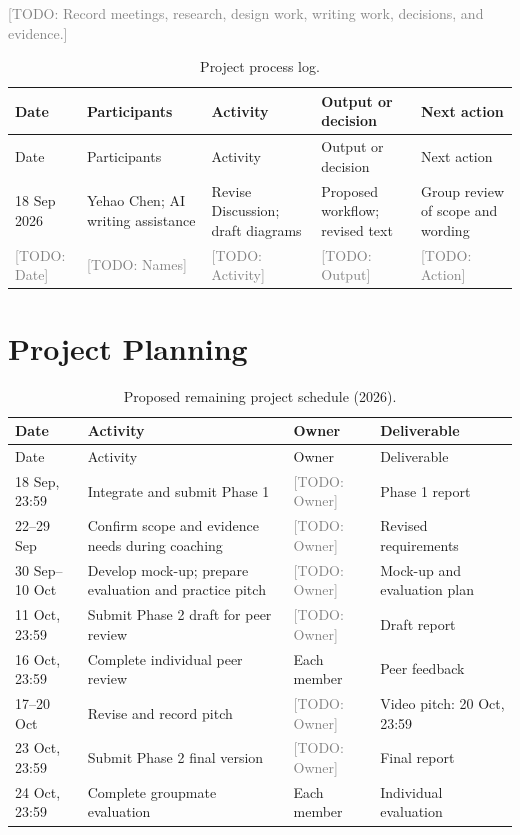 \documentclass[11pt,a4paper]{article}
\newcommand{\placeholder}[1]{\textcolor{gray}{[TODO: #1]}}
\begin{document}
\placeholder{Record meetings, research, design work, writing work, decisions, and evidence.}

\begin{longtable}{@{}p{}p{}p{}p{}p{}@{}}
\caption{Project process log.}\\
\toprule
Date & Participants & Activity & Output or decision & Next action \\
\midrule
\endfirsthead
\toprule
Date & Participants & Activity & Output or decision & Next action \\
\midrule
\endhead
18 Sep 2026 & Yehao Chen; AI writing assistance & Revise Discussion; draft diagrams & Proposed workflow; revised text & Group review of scope and wording \\
\placeholder{Date} & \placeholder{Names} & \placeholder{Activity} & \placeholder{Output} & \placeholder{Action} \\
\bottomrule
\end{longtable}

\clearpage
\section{Project Planning}

\begin{longtable}{@{}p{}p{}p{}p{}@{}}
\caption{Proposed remaining project schedule (2026).}\\
\toprule
Date & Activity & Owner & Deliverable \\
\midrule
\endfirsthead
\toprule
Date & Activity & Owner & Deliverable \\
\midrule
\endhead
18 Sep, 23:59 & Integrate and submit Phase 1 & \placeholder{Owner} & Phase 1 report \\
22--29 Sep & Confirm scope and evidence needs during coaching & \placeholder{Owner} & Revised requirements \\
30 Sep--10 Oct & Develop mock-up; prepare evaluation and practice pitch & \placeholder{Owner} & Mock-up and evaluation plan \\
11 Oct, 23:59 & Submit Phase 2 draft for peer review & \placeholder{Owner} & Draft report \\
16 Oct, 23:59 & Complete individual peer review & Each member & Peer feedback \\
17--20 Oct & Revise and record pitch & \placeholder{Owner} & Video pitch: 20 Oct, 23:59 \\
23 Oct, 23:59 & Submit Phase 2 final version & \placeholder{Owner} & Final report \\
24 Oct, 23:59 & Complete groupmate evaluation & Each member & Individual evaluation \\
\bottomrule
\end{longtable}
\end{document}
